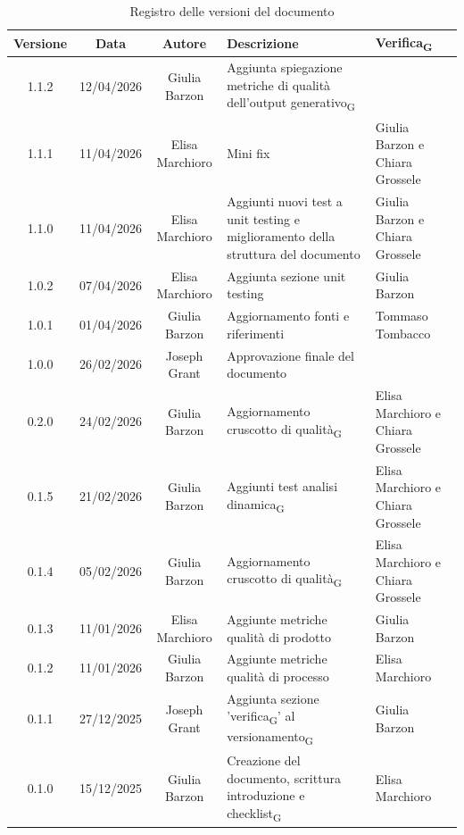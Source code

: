 \documentclass[11pt,a4paper]{article}
\newcommand{\gls}[1]{#1\textsubscript{G}}
\begin{document}
\begin{table}[H]
    \centering
    \begin{tabular}{|c|c|c|>{\raggedright\arraybackslash}p{}|p{}|}
        \hline
        \textbf{Versione} & \textbf{Data} & \textbf{Autore} & \textbf{Descrizione} & \textbf{\gls{Verifica}} \\
        \hline
        1.1.2 & 12/04/2026 & Giulia Barzon & Aggiunta spiegazione metriche di \gls{qualità dell'output generativo} & \\
        \hline
        1.1.1 & 11/04/2026 & Elisa Marchioro & Mini fix & Giulia Barzon e Chiara Grossele\\
        \hline
        1.1.0 & 11/04/2026 & Elisa Marchioro & Aggiunti nuovi test a unit testing e miglioramento della struttura del documento & Giulia Barzon e Chiara Grossele\\
        \hline
        1.0.2 & 07/04/2026 & Elisa Marchioro & Aggiunta sezione unit testing & Giulia Barzon\\
        \hline
        1.0.1 & 01/04/2026 & Giulia Barzon & Aggiornamento fonti e riferimenti & Tommaso Tombacco \\
        \hline
        1.0.0 & 26/02/2026 & Joseph Grant & Approvazione finale del documento &  \\
        \hline
        0.2.0 & 24/02/2026 & Giulia Barzon & Aggiornamento \gls{cruscotto di qualità} & Elisa Marchioro e Chiara Grossele\\
        \hline
        0.1.5 & 21/02/2026 & Giulia Barzon & Aggiunti test \gls{analisi dinamica} & Elisa Marchioro e Chiara Grossele\\
        \hline
        0.1.4 & 05/02/2026 & Giulia Barzon & Aggiornamento \gls{cruscotto di qualità} & Elisa Marchioro e Chiara Grossele\\
        \hline
        0.1.3 & 11/01/2026 & Elisa Marchioro & Aggiunte metriche qualità di prodotto & Giulia Barzon \\
        \hline
        0.1.2 & 11/01/2026 & Giulia Barzon & Aggiunte metriche qualità di processo & Elisa Marchioro\\
        \hline
        0.1.1 & 27/12/2025 & Joseph Grant & Aggiunta sezione '\gls{verifica}' al \gls{versionamento} & Giulia Barzon\\
        \hline
        0.1.0 & 15/12/2025 & Giulia Barzon & Creazione del documento, scrittura introduzione e \gls{checklist} & Elisa Marchioro\\
        \hline
    \end{tabular}
    \caption{Registro delle versioni del documento}
    \label{tab:versionamento}
\end{table}
\end{document}
